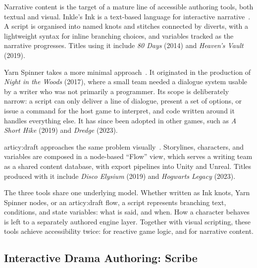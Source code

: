  
Narrative content is the target of a mature line of accessible authoring tools, both textual and visual. Inkle's Ink is a text-based language for interactive narrative~\cite{Inkle}. A script is organised into named knots and stitches connected by diverts, with a lightweight syntax for inline branching choices, and variables tracked as the narrative progresses. Titles using it include \textit{80 Days} (2014)  and \textit{Heaven's Vault} (2019).
 
Yarn Spinner takes a more minimal approach~\cite{YarnSpinner}. It originated in the production of \textit{Night in the Woods} (2017), where a small team needed a dialogue system usable by a writer who was not primarily a programmer. Its scope is deliberately narrow: a script can only deliver a line of dialogue, present a set of options, or issue a command for the host game to interpret, and code written around it handles everything else. It has since been adopted in other games, such as \textit{A Short Hike} (2019) and \textit{Dredge} (2023).
 
articy:draft approaches the same problem visually~\cite{ArticyDraft}. Storylines, characters, and variables are composed in a node-based ``Flow'' view, which serves a writing team as a shared content database, with export pipelines into Unity and Unreal. Titles produced with it include \textit{Disco Elysium} (2019) and \textit{Hogwarts Legacy} (2023).
 
The three tools share one underlying model. Whether written as Ink knots, Yarn Spinner nodes, or an articy:draft flow, a script represents branching text, conditions, and state variables: what is said, and when. How a character behaves is left to a separately authored engine layer. Together with visual scripting, these tools achieve accessibility twice: for reactive game logic, and for narrative content.
 
 
\subsection{Interactive Drama Authoring: Scribe}
\label{sec:scribe}
 
 
